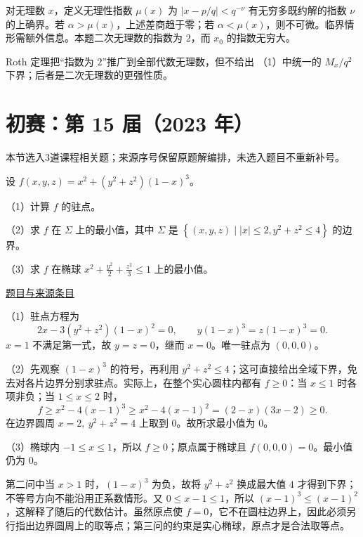 \documentclass[12pt,fontset=fandol]{ctexart}
\begin{document}
\begin{remark}[方法与条件]对无理数 $x$，定义无理性指数 $\mu(x)$ 为 $|x-p/q|<q^{-\nu}$ 有无穷多既约解的指数 $\nu$ 的上确界。若 $\alpha>\mu(x)$，上述差商趋于零；若 $\alpha<\mu(x)$，则不可微。临界情形需额外信息。本题二次无理数的指数为 $2$，而 $x_0$ 的指数无穷大。

Roth 定理把“指数为 $2$”推广到全部代数无理数，但不给出 （1）中统一的 $M_x/q^2$ 下界；后者是二次无理数的更强性质。\end{remark}

\section{初赛：第 15 届（2023 年）}

本节选入3道课程相关题；来源序号保留原题解编排，未选入题目不重新补号。

\begin{example}[来源序号2]\label{ex:ch03-15th-A:2}\label{pr:ch03-15th-A:2}

设 $f(x,y,z) = x^2 + \left(y^2 + z^2\right)(1-x)^3$。

（1）计算 $f$ 的驻点。

（2）求 $f$ 在 $\Sigma$ 上的最小值，其中 $\Sigma$ 是 $\left\{(x,y,z) \mid |x| \leq 2, y^2 + z^2 \leq 4\right\}$ 的边界。

（3）求 $f$ 在椭球 $x^2 + \frac{y^2}{2} + \frac{z^2}{3} \leq 1$ 上的最小值。

\par\href{https://github.com/lzxcr/cmc-mathematics/blob/64916fa1fdbc3e444a652eca204d5669058ee321/src/problems/preliminary/15/02.md}{题目与来源条目}

\end{example}

\begin{solve}\label{ans:ch03-15th-A:2}

（1）驻点方程为
\[
2x-3(y^2+z^2)(1-x)^2=0,\qquad
 y(1-x)^3=z(1-x)^3=0.
\]
$x=1$ 不满足第一式，故 $y=z=0$，继而 $x=0$。唯一驻点为 $(0,0,0)$。

（2）先观察 $(1-x)^3$ 的符号，再利用 $y^2+z^2\leq4$；这可直接给出全域下界，免去对各片边界分别求驻点。实际上，在整个实心圆柱内都有 $f\geq0$：当 $x\leq1$ 时各项非负；当 $1\leq x\leq2$ 时，
\[
f\geq x^2-4(x-1)^3
\geq x^2-4(x-1)^2=(2-x)(3x-2)\geq0.
\]
在边界圆周 $x=2,\ y^2+z^2=4$ 上取到 $0$。故所求最小值为 $0$。

（3）椭球内 $-1\leq x\leq1$，所以 $f\geq0$；原点属于椭球且 $f(0,0,0)=0$。最小值仍为 $0$。

第二问中当 $x>1$ 时，$(1-x)^3$ 为负，故将 $y^2+z^2$ 换成最大值 $4$ 才得到下界；不等号方向不能沿用正系数情形。又 $0\le x-1\le1$，所以 $(x-1)^3\le(x-1)^2$，这解释了随后的代数估计。虽然原点使 $f=0$，它不在圆柱边界上，因此必须另行指出边界圆周上的取等点；第三问的约束是实心椭球，原点才是合法取等点。

\end{solve}
\end{document}
